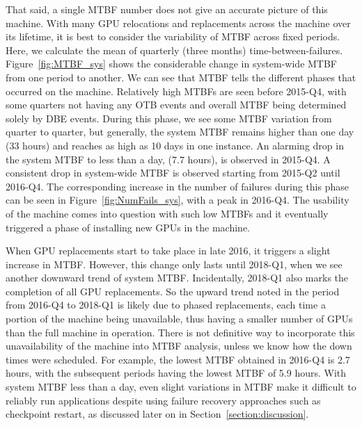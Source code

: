 That said, a single MTBF number does not give an accurate picture of this machine.
With many GPU relocations and replacements across the machine over its lifetime, it is 
best to consider the variability of MTBF across fixed periods. Here, we calculate 
the mean of quarterly (three months) time-between-failures. Figure~\ref{fig:MTBF_sys}
shows the considerable change in system-wide MTBF from one period to another. 
We can see that MTBF tells the different phases that occurred on the machine. 
Relatively high MTBFs are seen before 2015-Q4, with some quarters not having any OTB events 
and overall MTBF being determined solely by DBE events. During this
phase, we see some MTBF variation from quarter to quarter, but
generally, the system MTBF remains higher than one day (33 hours) and reaches as high
as 10 days in one instance. An alarming drop in the system MTBF to less than a day, (7.7 hours), is observed in 2015-Q4.
A consistent drop in system-wide MTBF is observed starting from 2015-Q2 until 2016-Q4. 
The corresponding increase in the number of failures during this phase can be seen in Figure~\ref{fig:NumFails_sys},
with a peak in 2016-Q4. The usability of the machine comes into
question with such low MTBFs and it eventually triggered 
a phase of installing new GPUs in the machine.

When GPU replacements start to take place in late 
2016, it triggers a slight increase in MTBF. However, this change only lasts until 2018-Q1, when we see another 
downward trend of system MTBF. Incidentally, 2018-Q1 also marks the completion of all GPU replacements. 
So the upward trend noted in the period from 2016-Q4 to 2018-Q1 is
likely due to phased replacements, each time a portion of the machine 
being unavailable, thus having a smaller number of GPUs than the full
machine in operation. 
There is not definitive way to incorporate this unavailability of the
machine into MTBF analysis, unless we know how the down times were scheduled.
For example, the lowest MTBF obtained in 2016-Q4 is 2.7 hours, with the subsequent periods having the 
lowest MTBF of 5.9 hours. With system MTBF less than a day, even slight variations in MTBF make it 
difficult to reliably run applications despite using failure recovery approaches such as checkpoint restart, 
as discussed later on in Section~\ref{section:discussion}. 

